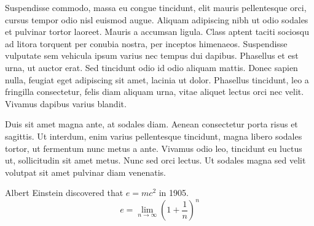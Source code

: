 \documentclass[11pt,a4paper,sans]{moderncv}
\begin{document}
Suspendisse commodo, massa eu congue tincidunt, elit mauris pellentesque
orci, cursus tempor odio nisl euismod augue. Aliquam adipiscing nibh ut
odio sodales et pulvinar tortor laoreet. Mauris a accumsan ligula. Class
aptent taciti sociosqu ad litora torquent per conubia nostra, per
inceptos himenaeos. Suspendisse vulputate sem vehicula ipsum varius nec
tempus dui dapibus. Phasellus et est urna, ut auctor erat. Sed tincidunt
odio id odio aliquam mattis. Donec sapien nulla, feugiat eget adipiscing
sit amet, lacinia ut dolor. Phasellus tincidunt, leo a fringilla
consectetur, felis diam aliquam urna, vitae aliquet lectus orci nec
velit. Vivamus dapibus varius blandit.

Duis sit amet magna ante, at sodales diam. Aenean consectetur porta
risus et sagittis. Ut interdum, enim varius pellentesque tincidunt,
magna libero sodales tortor, ut fermentum nunc metus a ante. Vivamus
odio leo, tincidunt eu luctus ut, sollicitudin sit amet metus. Nunc sed
orci lectus. Ut sodales magna sed velit volutpat sit amet pulvinar diam
venenatis.

Albert Einstein discovered that $e=mc^2$ in 1905.
\[ e=\lim_{n \to \infty} \left(1+\frac{1}{n}\right)^n \]
\makeletterclosing
\end{document}
